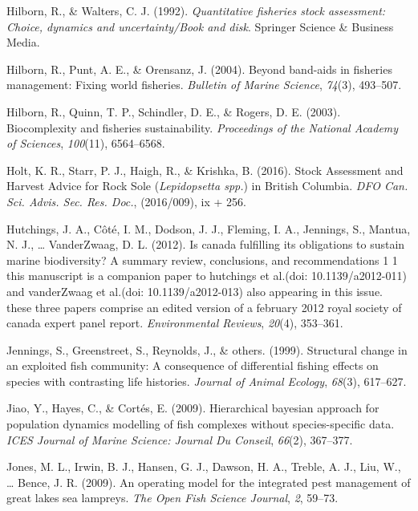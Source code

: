 \documentclass[12pt,]{scrartcl}
\begin{document}
\hypertarget{ref-hilborn1992quantitative}{}
Hilborn, R., \& Walters, C. J. (1992). \emph{Quantitative fisheries
stock assessment: Choice, dynamics and uncertainty/Book and disk}.
Springer Science \& Business Media.

\hypertarget{ref-hilborn2004beyond}{}
Hilborn, R., Punt, A. E., \& Orensanz, J. (2004). Beyond band-aids in
fisheries management: Fixing world fisheries. \emph{Bulletin of Marine
Science}, \emph{74}(3), 493--507.

\hypertarget{ref-hilborn2003biocomplexity}{}
Hilborn, R., Quinn, T. P., Schindler, D. E., \& Rogers, D. E. (2003).
Biocomplexity and fisheries sustainability. \emph{Proceedings of the
National Academy of Sciences}, \emph{100}(11), 6564--6568.

\hypertarget{ref-holt2016stock-asse}{}
Holt, K. R., Starr, P. J., Haigh, R., \& Krishka, B. (2016). Stock
Assessment and Harvest Advice for Rock Sole (\emph{Lepidopsetta spp.})
in British Columbia. \emph{DFO Can. Sci. Advis. Sec. Res. Doc.},
(2016/009), ix + 256.

\hypertarget{ref-hutchings2012canada}{}
Hutchings, J. A., Côté, I. M., Dodson, J. J., Fleming, I. A., Jennings,
S., Mantua, N. J., \ldots{} VanderZwaag, D. L. (2012). Is canada
fulfilling its obligations to sustain marine biodiversity? A summary
review, conclusions, and recommendations 1 1 this manuscript is a
companion paper to hutchings et al.(doi: 10.1139/a2012-011) and
vanderZwaag et al.(doi: 10.1139/a2012-013) also appearing in this issue.
these three papers comprise an edited version of a february 2012 royal
society of canada expert panel report. \emph{Environmental Reviews},
\emph{20}(4), 353--361.

\hypertarget{ref-jennings1999structural}{}
Jennings, S., Greenstreet, S., Reynolds, J., \& others. (1999).
Structural change in an exploited fish community: A consequence of
differential fishing effects on species with contrasting life histories.
\emph{Journal of Animal Ecology}, \emph{68}(3), 617--627.

\hypertarget{ref-jiao2009hierarchical}{}
Jiao, Y., Hayes, C., \& Cortés, E. (2009). Hierarchical bayesian
approach for population dynamics modelling of fish complexes without
species-specific data. \emph{ICES Journal of Marine Science: Journal Du
Conseil}, \emph{66}(2), 367--377.

\hypertarget{ref-jones2009operating}{}
Jones, M. L., Irwin, B. J., Hansen, G. J., Dawson, H. A., Treble, A. J.,
Liu, W., \ldots{} Bence, J. R. (2009). An operating model for the
integrated pest management of great lakes sea lampreys. \emph{The Open
Fish Science Journal}, \emph{2}, 59--73.
\end{document}
